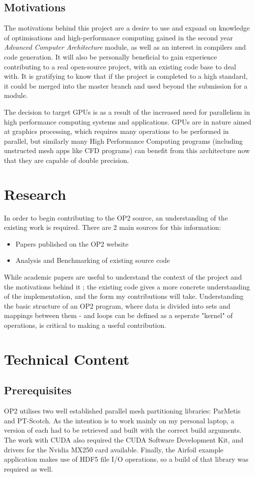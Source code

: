 \documentclass[11pt]{article}
\begin{document}
\subsection*{Motivations}
The motivations behind this project are a desire to use and expand on knowledge of optimisations and high-performance computing gained in the second year \textit{Advanced Computer Architecture} module, as well as an interest in compilers and code generation. It will also be personally beneficial to gain experience contributing to a real open-source project, with an existing code base to deal with. It is gratifying to know that if the project is completed to a high standard, it could be merged into the master branch and used beyond the submission for a module.
\par The decision to target GPUs is as a result of the increased need for parallelism in high performance computing systems and applications. GPUs are in nature aimed at graphics processing, which requires many operations to be performed in parallel, but similarly many High Performance Computing programs (including unstructed mesh apps like CFD programs) can benefit from this architecture now that they are capable of double precision.
\section*{Research}
In order to begin contributing to the OP2 source, an understanding of the existing work is required. There are 2 main sources for this information:
\begin{itemize}
 \item{Papers published on the OP2 website}
 \item{Analysis and Benchmarking of existing source code}
\end{itemize}
While academic papers are useful to understand the context of the project and the motivations behind it \cite{op2main} \cite{autoVector} \cite{industrial}; the existing code gives a more concrete understanding of the implementation, and the form my contributions will take. Understanding the basic structure of an OP2 program, where data is divided into sets and mappings between them - and loops can be defined as a seperate "kernel" of operations, is critical to making a useful contribution.

\section*{Technical Content}
\subsection*{Prerequisites}
OP2 utilises two well established parallel mesh partitioning libraries: ParMetis\cite{metis} and PT-Scotch\cite{scotch}. As the intention is to work mainly on my personal laptop, a version of each had to be retrieved and built with the correct build arguments. The work with CUDA also required the CUDA Software Development Kit\cite{cuda}, and drivers for the Nvidia MX250 card available. Finally, the Airfoil example application makes use of HDF5 file I/O operations, so a build of that library was required as well.
\end{document}
